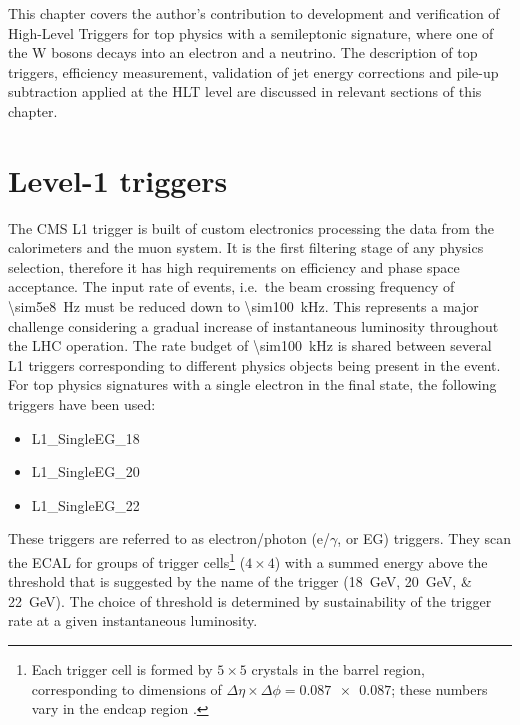 This chapter covers the author's contribution to development and verification of High-Level Triggers for top physics
with a semileptonic signature, where one of the W bosons decays into an electron and a neutrino. The description of top
triggers, efficiency measurement, validation of jet energy corrections and pile-up subtraction applied at the HLT level
are discussed in relevant sections of this chapter.

\section{Level-1 triggers}
The CMS L1 trigger \autocite{CMS_L1_Trigger_TDR} is built of custom electronics processing the data from the
calorimeters and the muon system. It is the first filtering stage of any physics selection, therefore it has high
requirements on efficiency and phase space acceptance. The input rate of events, i.e.\ the beam crossing frequency of
\SI{\sim5e8}{\hertz} must be reduced down to \SI{\sim100}{\kilo\hertz}. This represents a major challenge considering a
gradual increase of instantaneous luminosity throughout the LHC operation. The rate budget of \SI{\sim100}{\kilo\hertz}
is shared between several L1 triggers corresponding to different physics objects being present in the event. For top
physics signatures with a single electron in the final state, the following triggers have been used:

\begin{itemize}
 \item L1\_SingleEG\_18
 \item L1\_SingleEG\_20
 \item L1\_SingleEG\_22
\end{itemize}

These triggers are referred to as electron/photon (e/$\gamma$, or EG) triggers. They scan the ECAL for groups of trigger
cells\footnote{Each trigger cell is formed by $5 \times 5$ crystals in the barrel region, corresponding to dimensions of
$\Delta\eta \times \Delta\phi = \num{0.087 x 0.087}$; these numbers vary in the endcap region
\autocite{CMS_L1_Trigger_TDR}.} ($4 \times 4$) with a summed energy above the threshold that is suggested by the name of
the trigger (\SIlist{18;20;22}{\GeV}). The choice of threshold is determined by sustainability of the trigger rate at a
given instantaneous luminosity.

